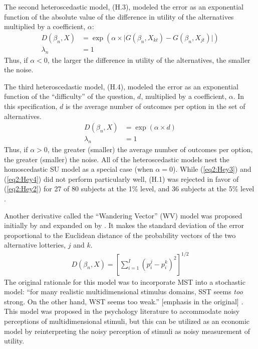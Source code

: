 \documentclass[11pt,a4paper]{report}
\begin{document}
The second heteroscedastic model, (H.3), modeled the error as an exponential function of the absolute value of the difference in utility of the alternatives multiplied by a coefficient, $\alpha$:
\begin{align*}
	\tag{H.3}
	\label{eq2:Hey3}
	D(\beta_n,X) &= \exp\left(\alpha \times \lvert G(\beta_n,X_{kt}) - G(\beta_n,X_{jt}) \rvert\right)\\
	\lambda_n &= 1
\end{align*}
Thus, if $\alpha < 0$, the larger the difference in utility of the alternatives, the smaller the noise.

The third heteroscedastic model, (H.4), modeled the error as an exponential function of the \enquote{difficulty} of the question, $d$, multiplied by a coefficient, $\alpha$.
In this specification, $d$ is the average number of outcomes per option in the set of alternatives.
\begin{align*}
	\tag{H.4}
	\label{eq2:Hey4}
	D(\beta_n,X) &= \exp(\alpha \times d)\\
	\lambda_n &= 1
\end{align*}
Thus, if $\alpha > 0$, the greater (smaller) the average number of outcomes per option, the greater (smaller) the noise.
All of the heteroscedastic models nest the homoscedastic SU model as a special case (when $\alpha=0$).
While (\ref{eq2:Hey3}) and (\ref{eq2:Hey4}) did not perform particularly well, (H.1) was rejected in favor of (\ref{eq2:Hey2}) for 27 of 80 subjects at the 1\% level, and 36 subjects at the 5\% level \parencite*[639]{Hey1995a}.

Another derivative called the \enquote{Wandering Vector} (WV) model was proposed initially by \textcite{Carroll1980} and expanded on by \textcite{Carroll1991}.
It makes the standard deviation of the error proportional to the Euclidean distance of the probability vectors of the two alternative lotteries, $j$ and $k$.
\begin{align*}
	D(\beta_n,X) = \left[  \sum_{i=1}^I (p_i^j - p_i^k)^2 \right]^{1/2}
\end{align*}
The original rationale for this model was to incorporate MST into a stochastic model: \enquote{for many realistic multidimensional stimulus domains, SST seems \textit{too} strong.
On the other hand, WST seems too weak.} [emphasis in the original] \parencite*[343]{Carroll1991}.
This model was proposed in the psychology literature to accommodate noisy perceptions of multidimensional stimuli, but this can be utilized as an economic model by reinterpreting the noisy perception of stimuli as noisy measurement of utility.
\end{document}
